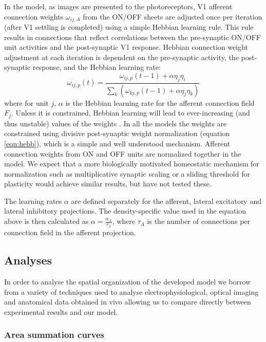 In the model, as images are presented to the photoreceptors, V1
afferent connection weights $\omega_{ij,A}$ from the ON/OFF sheets are
adjusted once per iteration (after V1 settling is completed) using a
simple Hebbian learning rule. This rule results in connections that
reflect correlations between the pre-synaptic ON/OFF unit activities
and the post-synaptic V1 response.  Hebbian connection weight
adjustment at each iteration is dependent on the pre-synaptic
activity, the post-synaptic response, and the Hebbian learning rate:
\begin{equation}
\omega_{ij,p}(t)=\frac{\omega_{ij,p}(t-1)+\alpha\eta_{j}\eta_{i}}{\sum_{k}\left(\omega_{kj,p}(t-1)+\alpha\eta_{j}\eta_{k}\right)}
\label{eqn:hebb}
\end{equation}
where for unit $j$, $\alpha$ is the Hebbian learning rate for the
afferent connection field $F_{j}$. Unless it is constrained, Hebbian
learning will lead to ever-increasing (and thus unstable) values of
the weights \citep{Rochester1956}. In all the models the weights are
constrained using divisive post-synaptic weight normalization
(equation \ref{eqn:hebb}), which is a simple and well understood
mechanism. Afferent connection weights from ON and OFF units are
normalized together in the model. We expect that a more biologically
motivated homeostatic mechanism for normalization such as
multiplicative synaptic scaling
\citep{Turrigiano1999,Turrigiano2004,Sullivan2006} or a sliding
threshold for plasticity \citep{Bienenstock1982} would achieve similar
results, but have not tested these.

The learning rates $\alpha$ are defined separately for the afferent,
lateral excitatory and lateral inhibitory projections. The
density-specific value used in the equation above is then calculated
as $\alpha=\frac{\alpha_{A}}{\tau_{A}}$, where $\tau_{A}$ is the
number of connections per connection field in the afferent projection.

\subsection{Analyses}

In order to analyse the spatial organization of the developed model we
borrow from a variety of techniques used to analyse
electrophysiological, optical imaging and anatomical data obtained in
vivo allowing us to compare directly between experimental results and
our model.

\subsubsection{Area summation curves} \label{DoG_Section}

